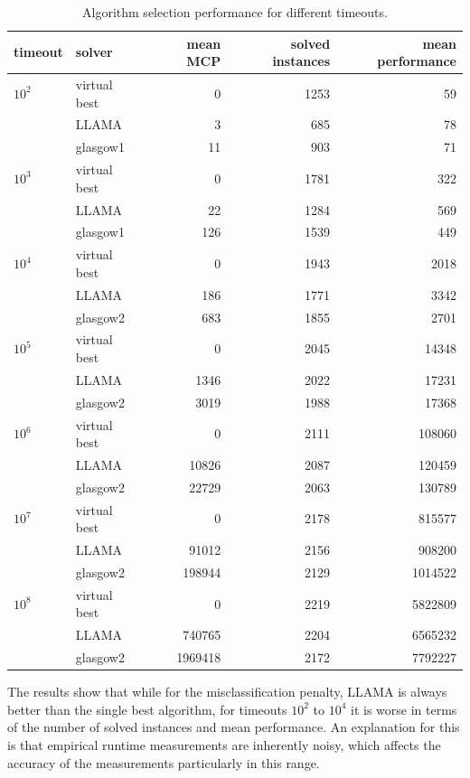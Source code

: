 \documentclass{llncs}
\begin{document}
\begin{table}[ht]
\centering
\begin{tabular}{llrrr}
  \toprule
timeout & solver & mean MCP & solved instances & mean performance\\
  \midrule
$10^2$ & virtual best & 0 & 1253 & 59\\
 & LLAMA & 3 & 685 & 78\\
 & glasgow1 & 11 & 903 & 71\\
  \midrule
$10^3$ & virtual best & 0 & 1781 & 322\\
 & LLAMA & 22 & 1284 & 569\\
 & glasgow1 & 126 & 1539 & 449\\
  \midrule
$10^4$ & virtual best & 0 & 1943 & 2018\\
 & LLAMA & 186 & 1771 & 3342\\
 & glasgow2 & 683 & 1855 & 2701\\
  \midrule
$10^5$ & virtual best & 0 & 2045 & 14348\\
 & LLAMA & 1346 & 2022 & 17231\\
 & glasgow2 & 3019 & 1988 & 17368\\
  \midrule
$10^6$ & virtual best & 0 & 2111 & 108060\\
 & LLAMA & 10826 & 2087 & 120459\\
 & glasgow2 & 22729 & 2063 & 130789\\
  \midrule
$10^7$ & virtual best & 0 & 2178 & 815577\\
 & LLAMA & 91012 & 2156 & 908200\\
 & glasgow2 & 198944 & 2129 & 1014522\\
  \midrule
$10^8$ & virtual best & 0 & 2219 & 5822809\\
 & LLAMA & 740765 & 2204 & 6565232\\
 & glasgow2 & 1969418 & 2172 & 7792227\\
\bottomrule
\end{tabular}
\vspace{1ex}
\caption{Algorithm selection performance for different timeouts.}\label{tab:resTimeouts}
\end{table}

The results show that while for the misclassification penalty, LLAMA is always
better than the single best algorithm, for timeouts $10^2$ to $10^4$ it is worse
in terms of the number of solved instances and mean performance. An explanation
for this is that empirical runtime measurements are inherently noisy, which
affects the accuracy of the measurements particularly in this range.
\end{document}
